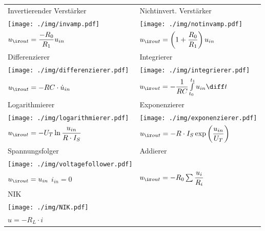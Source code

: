 \documentclass[fs, footer]{latex4ei}
\begin{document}
\begin{multicols*}{4}
    \begin{tabular}{ll}
        Invertierender Verstärker                                & Nichtinvert. Verstärker                                              \\
        \texttt{[image: ./img/invamp.pdf]}          & \texttt{[image: ./img/notinvamp.pdf]}                   \\
        $u_{\ir out} = \frac{-R_0}{R_1} u_{in}$                  & $u_{\ir out} = \left( 1+ \frac{R_0}{R_1} \right) u_{in}$             \\[0.5em] \mrule
        Differenzierer                                           & Integrierer                                                          \\
        \texttt{[image: ./img/differenzierer.pdf]}  & \texttt{[image: ./img/integrierer.pdf]}                 \\
        $u_{\ir out} = -RC \cdot \dot u_{in}$                    & $u_{\ir out} = -\frac{1}{RC} \int\limits^{t_1}_{t_0} u_{in} \diff t$ \\ \mrule
        Logarithmierer                                           & Exponenzierer                                                        \\
        \texttt{[image: ./img/logarithmierer.pdf]}  & \texttt{[image: ./img/exponenzierer.pdf]}               \\
        $u_{\ir out} = -U_T \ln \frac{u_{in}}{R \cdot I_S}$      & $u_{\ir out} = -R \cdot I_S \exp \left( \frac{u_{in}}{U_T} \right)$  \\ \mrule
        Spannungsfolger                                          & Addierer                                                             \\
        \texttt{[image: ./img/voltagefollower.pdf]} &                                                                      \\
        $u_{\ir out} = u_{in}$ \quad $i_{in} = 0$                & $u_{\ir out} = -R_0 \sum \frac{u_i}{R_i}$                            \\ \mrule
        NIK                                                      &                                                                      \\
        \texttt{[image: ./img/NIK.pdf]}             &                                                                      \\
        $u = -R_L \cdot i$                                                                                                              \\
    \end{tabular}



\end{multicols*}
\end{document}
